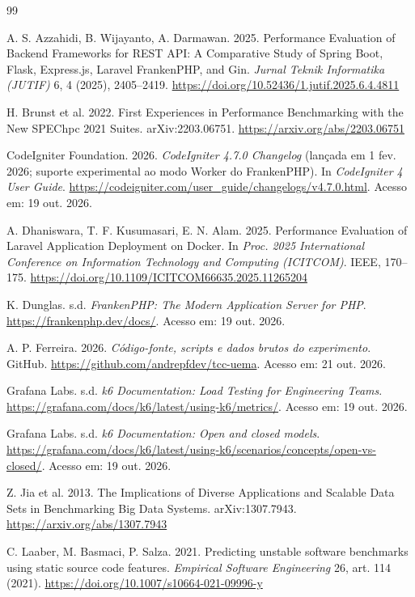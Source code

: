 \documentclass[sigconf, nonacm, screen, language=portuguese, language=spanish, language={main=english}]{acmart}
\begin{document}

\begin{thebibliography}{99}

A. S. Azzahidi, B. Wijayanto, A. Darmawan. 2025. Performance Evaluation of Backend Frameworks for REST API: A Comparative Study of Spring Boot, Flask, Express.js, Laravel FrankenPHP, and Gin. \textit{Jurnal Teknik Informatika (JUTIF)} 6, 4 (2025), 2405--2419. \url{https://doi.org/10.52436/1.jutif.2025.6.4.4811}

H. Brunst et al. 2022. First Experiences in Performance Benchmarking with the New SPEChpc 2021 Suites. arXiv:2203.06751. \url{https://arxiv.org/abs/2203.06751}

CodeIgniter Foundation. 2026. \textit{CodeIgniter 4.7.0 Changelog} (lançada em 1 fev. 2026; suporte experimental ao modo Worker do FrankenPHP). In \textit{CodeIgniter 4 User Guide}. \url{https://codeigniter.com/user_guide/changelogs/v4.7.0.html}. Acesso em: 19 out. 2026.

A. Dhaniswara, T. F. Kusumasari, E. N. Alam. 2025. Performance Evaluation of Laravel Application Deployment on Docker. In \textit{Proc. 2025 International Conference on Information Technology and Computing (ICITCOM)}. IEEE, 170--175. \url{https://doi.org/10.1109/ICITCOM66635.2025.11265204}

K. Dunglas. s.d. \textit{FrankenPHP: The Modern Application Server for PHP}. \url{https://frankenphp.dev/docs/}. Acesso em: 19 out. 2026.

A. P. Ferreira. 2026. \textit{Código-fonte, \textit{scripts} e dados brutos do experimento}. GitHub. \url{https://github.com/andrepfdev/tcc-uema}. Acesso em: 21 out. 2026.

Grafana Labs. s.d. \textit{k6 Documentation: Load Testing for Engineering Teams}. \url{https://grafana.com/docs/k6/latest/using-k6/metrics/}. Acesso em: 19 out. 2026.

Grafana Labs. s.d. \textit{k6 Documentation: Open and closed models}. \url{https://grafana.com/docs/k6/latest/using-k6/scenarios/concepts/open-vs-closed/}. Acesso em: 19 out. 2026.

Z. Jia et al. 2013. The Implications of Diverse Applications and Scalable Data Sets in Benchmarking Big Data Systems. arXiv:1307.7943. \url{https://arxiv.org/abs/1307.7943}

C. Laaber, M. Basmaci, P. Salza. 2021. Predicting unstable software benchmarks using static source code features. \textit{Empirical Software Engineering} 26, art. 114 (2021). \url{https://doi.org/10.1007/s10664-021-09996-y}


\end{thebibliography}
\end{document}
